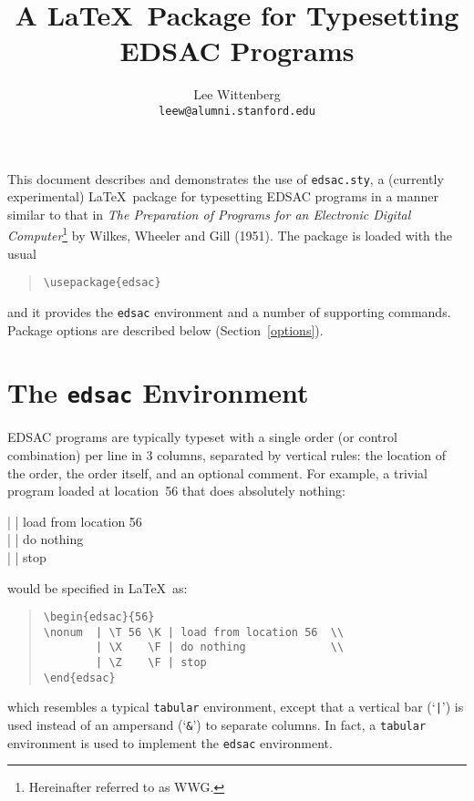 \documentclass[11pt]{article}
\title{A \LaTeX\ Package for Typesetting EDSAC Programs}
\author{Lee Wittenberg\\\texttt{leew@alumni.stanford.edu}}
\begin{document}
\maketitle

\noindent
This document describes and demonstrates the use of \texttt{edsac.sty}, a
(currently experimental) \LaTeX\ package for typesetting EDSAC
programs in a manner similar to that in \emph{The Preparation of
Programs for an Electronic Digital Computer}\footnote{Hereinafter
referred to as WWG.} by Wilkes, Wheeler and
Gill (1951).  The package is loaded with the usual
\begin{quote}
    \verb"\usepackage{edsac}"
\end{quote}
and it provides the
\texttt{edsac} environment and a number of supporting commands.
Package options are described below (Section~\ref{options}).

\section{The \texttt{edsac} Environment}

EDSAC programs are typically typeset with a single order (or control
combination) per line in 3 columns, separated by vertical rules:
the location of the order, the order itself, and an optional comment.
For example, a trivial program loaded at location~56 that does
absolutely nothing:
\begin{edsac}{56}
\nonum  |  \K | load from location 56  \\
        | \X    \F | do nothing             \\
        | \Z    \F | stop
\end{edsac}
would be specified in \LaTeX\ as:
\begin{quote}\small
\begin{verbatim}
\begin{edsac}{56}
\nonum  | \T 56 \K | load from location 56  \\
        | \X    \F | do nothing             \\
        | \Z    \F | stop
\end{edsac}
\end{verbatim}
\end{quote}
which resembles a typical \texttt{tabular} environment, except that a
vertical bar (`\verb"|"') is used instead of an ampersand (`\verb"&"')
to separate columns.  In fact, a \texttt{tabular} environment is used
to implement the \texttt{edsac} environment.
\end{document}
